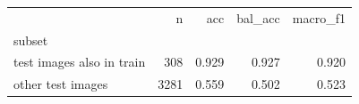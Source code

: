 \begin{tabular}{lrrrr}
\toprule
 & n & acc & bal_acc & macro_f1 \\
subset &  &  &  &  \\
\midrule
test images also in train & 308 & 0.929 & 0.927 & 0.920 \\
other test images & 3281 & 0.559 & 0.502 & 0.523 \\
\bottomrule
\end{tabular}
